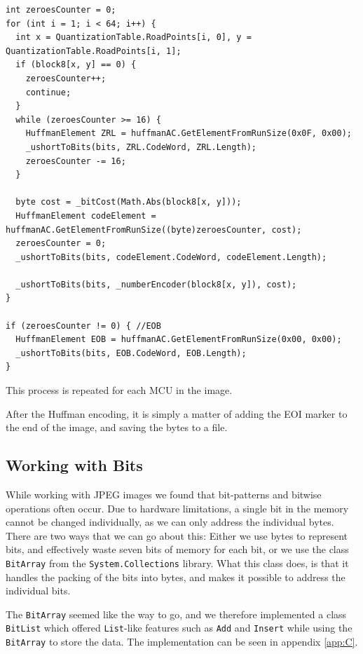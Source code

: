 \begin{lstlisting}[firstnumber=806,label=ACencoding,caption={Encoding AC coefficients into the image \textbf{File: }JPEGImage.cs}]
int zeroesCounter = 0;
for (int i = 1; i < 64; i++) {
  int x = QuantizationTable.RoadPoints[i, 0], y = QuantizationTable.RoadPoints[i, 1];
  if (block8[x, y] == 0) {
    zeroesCounter++;
    continue;
  }
  while (zeroesCounter >= 16) {
    HuffmanElement ZRL = huffmanAC.GetElementFromRunSize(0x0F, 0x00);
    _ushortToBits(bits, ZRL.CodeWord, ZRL.Length);
    zeroesCounter -= 16;
  }

  byte cost = _bitCost(Math.Abs(block8[x, y]));
  HuffmanElement codeElement = huffmanAC.GetElementFromRunSize((byte)zeroesCounter, cost);
  zeroesCounter = 0;
  _ushortToBits(bits, codeElement.CodeWord, codeElement.Length);

  _ushortToBits(bits, _numberEncoder(block8[x, y]), cost);
}

if (zeroesCounter != 0) { //EOB
  HuffmanElement EOB = huffmanAC.GetElementFromRunSize(0x00, 0x00);
  _ushortToBits(bits, EOB.CodeWord, EOB.Length);
}
\end{lstlisting}

This process is repeated for each MCU in the image.

After the Huffman encoding, it is simply a matter of adding the EOI marker to the end of the image, and saving the bytes to a file. 

\subsection{Working with Bits}
While working with JPEG images we found that bit-patterns and bitwise operations often occur.
Due to hardware limitations, a single bit in the memory cannot be changed individually, as we can only address the individual bytes.
There are two ways that we can go about this:
Either we use bytes to represent bits, and effectively waste seven bits of memory for each bit, or we use the class \lstinline|BitArray| from the \lstinline|System.Collections| library.
What this class does, is that it handles the packing of the bits into bytes, and makes it possible to address the individual bits.

The \lstinline|BitArray| seemed like the way to go, and we therefore implemented a class \lstinline|BitList| which offered \lstinline|List|-like features such as \lstinline|Add| and \lstinline|Insert| while using the \lstinline|BitArray| to store the data.
The implementation can be seen in appendix \ref{app:C}. 

